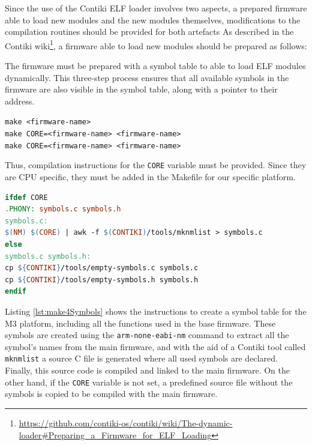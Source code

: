 Since the use of the Contiki ELF loader involves two aspects, a prepared firmware able to load new modules and the new modules themselves, modifications to the compilation routines should be provided for both artefacts
As described in the Contiki wiki\footnote{\url{https://github.com/contiki-os/contiki/wiki/The-dynamic-loader\#Preparing_a_Firmware_for_ELF_Loading}}, a firmware able to load new modules should be prepared as follows:
\begin{citeverbatim}
	The firmware must be prepared with a symbol table to able to load ELF modules dynamically.
	This three-step process ensures that all available symbols in the firmware are also visible in the symbol table, along with a pointer to their address.
	
	\texttt{make <firmware-name>} \\
	\texttt{make CORE=<firmware-name> <firmware-name>} \\
	\texttt{make CORE=<firmware-name> <firmware-name>} \\
\end{citeverbatim}
Thus, compilation instructions for the \texttt{CORE} variable must be provided.
Since they are CPU specific, they must be added in the Makefile for our specific platform.
\\
\begin{lstlisting}[language=make, caption=Compilation settings to create a proper symbol table, label=lst:make4Symbols]
ifdef CORE
.PHONY: symbols.c symbols.h
symbols.c:
$(NM) $(CORE) | awk -f $(CONTIKI)/tools/mknmlist > symbols.c
else
symbols.c symbols.h:
cp ${CONTIKI}/tools/empty-symbols.c symbols.c
cp ${CONTIKI}/tools/empty-symbols.h symbols.h
endif
\end{lstlisting}

Listing \ref{lst:make4Symbols} shows the instructions to create a symbol table for the M3 platform, including all the functions used in the base firmware.
These symbols are created using the \texttt{arm-none-eabi-nm} command to extract all the symbol's names from the main firmware, and with the aid of a Contiki tool called \texttt{mknmlist} a source C file is generated where all used symbols are declared.
Finally, this source code is compiled and linked to the main firmware.
On the other hand, if the \texttt{CORE} variable is not set, a predefined source file without the symbols is copied to be compiled with the main firmware.

